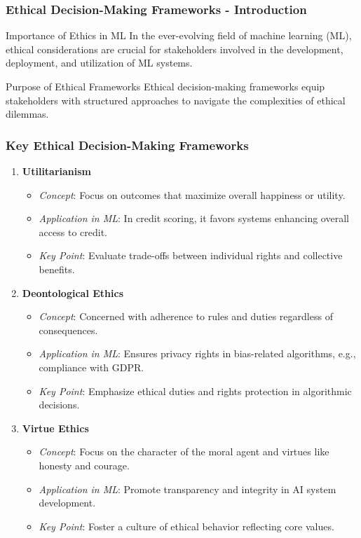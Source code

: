 \documentclass[aspectratio=169]{beamer}
\begin{document}
\begin{frame}[fragile]
    \frametitle{Ethical Decision-Making Frameworks - Introduction}
    \begin{block}{Importance of Ethics in ML}
        In the ever-evolving field of machine learning (ML), ethical considerations are crucial for stakeholders involved in the development, deployment, and utilization of ML systems.
    \end{block}
    \begin{block}{Purpose of Ethical Frameworks}
        Ethical decision-making frameworks equip stakeholders with structured approaches to navigate the complexities of ethical dilemmas.
    \end{block}
\end{frame}

\begin{frame}[fragile]
    \frametitle{Key Ethical Decision-Making Frameworks}
    \begin{enumerate}
        \item \textbf{Utilitarianism}
            \begin{itemize}
                \item \textit{Concept}: Focus on outcomes that maximize overall happiness or utility.
                \item \textit{Application in ML}: In credit scoring, it favors systems enhancing overall access to credit.
                \item \textit{Key Point}: Evaluate trade-offs between individual rights and collective benefits.
            \end{itemize}
        
        \item \textbf{Deontological Ethics}
            \begin{itemize}
                \item \textit{Concept}: Concerned with adherence to rules and duties regardless of consequences.
                \item \textit{Application in ML}: Ensures privacy rights in bias-related algorithms, e.g., compliance with GDPR.
                \item \textit{Key Point}: Emphasize ethical duties and rights protection in algorithmic decisions.
            \end{itemize}

        \item \textbf{Virtue Ethics}
            \begin{itemize}
                \item \textit{Concept}: Focus on the character of the moral agent and virtues like honesty and courage.
                \item \textit{Application in ML}: Promote transparency and integrity in AI system development.
                \item \textit{Key Point}: Foster a culture of ethical behavior reflecting core values.
            \end{itemize}
    \end{enumerate}
\end{frame}
\end{document}
